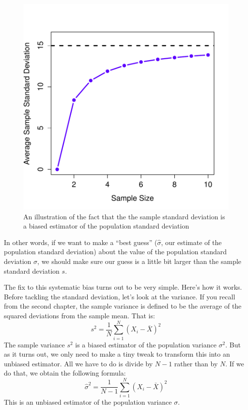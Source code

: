 \documentclass[
]{book}
\begin{document}
\begin{figure}
\centering
\includegraphics{navarro_img/estimation/biasSD-eps-converted-to.pdf}
\caption{\label{fig:estimatorbiasB}An illustration of the fact that the the sample standard deviation is a biased estimator of the population standard deviation}
\end{figure}

In other words, if we want to make a ``best guess'' (\(\hat\sigma\), our estimate of the population standard deviation) about the value of the population standard deviation \(\sigma\), we should make sure our guess is a little bit larger than the sample standard deviation \(s\).

The fix to this systematic bias turns out to be very simple. Here's how it works. Before tackling the standard deviation, let's look at the variance. If you recall from the second chapter, the sample variance is defined to be the average of the squared deviations from the sample mean. That is: \[s^2 = \frac{1}{N} \sum_{i=1}^N (X_i - \bar{X})^2\] The sample variance \(s^2\) is a biased estimator of the population variance \(\sigma^2\). But as it turns out, we only need to make a tiny tweak to transform this into an unbiased estimator. All we have to do is divide by \(N-1\) rather than by \(N\). If we do that, we obtain the following formula: \[\hat\sigma^2 = \frac{1}{N-1} \sum_{i=1}^N (X_i - \bar{X})^2\] This is an unbiased estimator of the population variance \(\sigma\).
\end{document}
